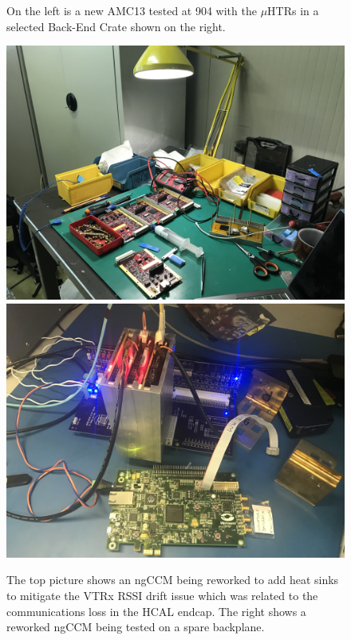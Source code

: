 \begin{figure}[!htb]
	\caption{On the left is a new AMC13 tested at 904 with the $\mu$HTRs in a selected Back-End Crate shown on the right.}
	\label{fig:BackendCrate9041}
\end{figure}

\begin{figure}[!htb]
	\centering
	\includegraphics[scale=0.08]{fig/coolingfins.jpg}
     \includegraphics[scale=0.08]{fig/testing.jpg}
	\caption{The top picture shows an ngCCM being reworked to add heat sinks to mitigate the VTRx RSSI drift issue which was related to the communications loss in the HCAL endcap. The right shows a reworked ngCCM being tested on a spare backplane.}
	\label{fig:BackendCrate9042}
\end{figure}


